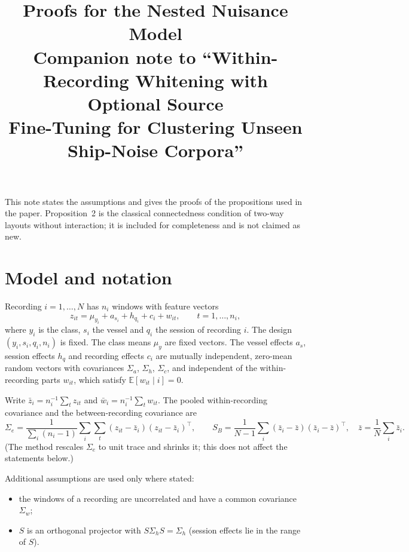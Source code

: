 \documentclass[10pt]{article}
\title{Proofs for the Nested Nuisance Model\\[6pt]\large Companion note to ``Within-Recording Whitening with Optional Source\\ Fine-Tuning for Clustering Unseen Ship-Noise Corpora''}
\author{}
\date{}
\newcommand{\E}{\mathbb{E}}
\begin{document}
\maketitle

\noindent This note states the assumptions and gives the proofs of the propositions used in the paper. Proposition~2 is the classical connectedness condition of two-way layouts without interaction; it is included for completeness and is not claimed as new.

\section{Model and notation}
Recording $i=1,\dots,N$ has $n_i$ windows with feature vectors
\[
z_{it}=\mu_{y_i}+a_{s_i}+h_{q_i}+c_i+w_{it},\qquad t=1,\dots,n_i ,
\]
where $y_i$ is the class, $s_i$ the vessel and $q_i$ the session of recording $i$. The design $(y_i,s_i,q_i,n_i)$ is fixed. The class means $\mu_y$ are fixed vectors. The vessel effects $a_s$, session effects $h_q$ and recording effects $c_i$ are mutually independent, zero-mean random vectors with covariances $\Sigma_a$, $\Sigma_h$, $\Sigma_c$, and independent of the within-recording parts $w_{it}$, which satisfy $\E[w_{it}\mid i]=0$.

Write $\bar z_i=n_i^{-1}\sum_t z_{it}$ and $\bar w_i=n_i^{-1}\sum_t w_{it}$. The pooled within-recording covariance and the between-recording covariance are
\[
\Sigma_e=\frac{1}{\sum_i (n_i-1)}\sum_i\sum_t (z_{it}-\bar z_i)(z_{it}-\bar z_i)^{\top},\qquad
S_B=\frac{1}{N-1}\sum_i(\bar z_i-\bar z)(\bar z_i-\bar z)^{\top},\quad \bar z=\frac1N\sum_i\bar z_i .
\]
(The method rescales $\Sigma_e$ to unit trace and shrinks it; this does not affect the statements below.)

Additional assumptions are used only where stated:
\begin{itemize}
\item[(A0)] the windows of a recording are uncorrelated and have a common covariance $\Sigma_w$;
\item[(A2)] $S$ is an orthogonal projector with $S\Sigma_hS=\Sigma_h$ (session effects lie in the range of $S$).
\end{itemize}
\end{document}
